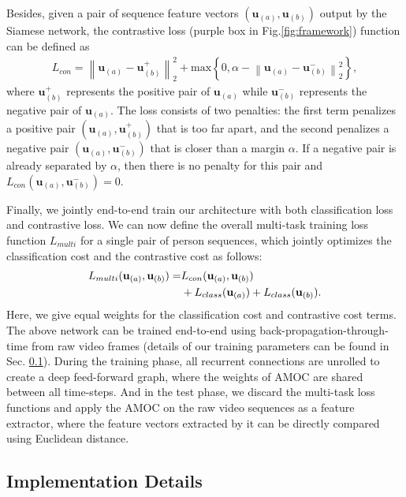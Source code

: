 \documentclass[journal]{IEEEtran}
\begin{document}
Besides, given a pair of sequence feature vectors $(\mathbf{u}_{(a)}, \mathbf{u}_{(b)})$  output by the Siamese network,  the contrastive loss (purple box in Fig.\ref{fig:framework}) function can be defined as
\begin{align}\label{con_loss}
L_{con} = \left \| \mathbf{u}_{(a)} - \mathbf{u}^+_{(b)}  \right \|_{2}^{2}+\mathrm{max}\left\{0, \alpha-  \left \| \mathbf{u}_{(a)} - \mathbf{u}^-_{(b)}  \right \|_{2}^{2} \right\},
\end{align}
where $\mathbf{u}^+_{(b)}$ represents the positive pair of $\mathbf{u}_{(a)}$ while $\mathbf{u}^-_{(b)}$ represents the negative pair of $\mathbf{u}_{(a)}$. The loss consists of two penalties: the first term penalizes a positive pair $(\mathbf{u}_{(a)}, \mathbf{u}^+_{(b)})$ that is too far apart, and the second penalizes a negative pair $(\mathbf{u}_{(a)}, \mathbf{u}^-_{(b)})$ that is closer than a margin $\alpha$. If a negative pair is already separated by $\alpha$, then there is no penalty for this pair and $L_{con}(\mathbf{u}_{(a)},\mathbf{u}^-_{(b)}) = 0$.

Finally, we jointly end-to-end train our architecture with both classification loss and contrastive loss.  We can now define the overall multi-task training loss function  $\textit{L}_{multi}$ for a single pair of person sequences, which jointly optimizes the classification cost and the contrastive cost as follows:
\begin{align}
L_{multi}(\mathbf{u}_{(a)},\mathbf{u}_{(b)}) = &L_{con}(\mathbf{u}_{(a)},\mathbf{u}_{(b)})\notag\\
&+L_{class}(\mathbf{u}_{(a)})+L_{class}(\mathbf{u}_{(b)}).
\end{align}
Here, we give equal weights for the classification cost and contrastive cost terms. The above network can be trained end-to-end using back-propagation-through-time from raw video frames (details of our training parameters can be found in Sec. \ref{impl_details}). During the training phase, all recurrent connections are unrolled to create a deep feed-forward graph, where the weights of AMOC are shared between all time-steps. And in the test phase,  we discard the multi-task loss functions and apply the AMOC on the raw video sequences as a feature extractor, where the feature vectors extracted by it can be directly compared using Euclidean distance.


\subsection{Implementation Details}\label{impl_details}
\end{document}
